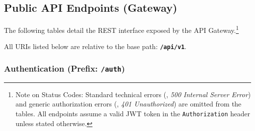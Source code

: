 \subsection{Public API Endpoints (Gateway)}
The following tables detail the REST interface exposed by the API Gateway.\footnote{Note on Status Codes: Standard technical errors (\eg, \emph{500 Internal Server Error}) and generic authorization errors (\eg, \emph{401 Unauthorized}) are omitted from the tables. All endpoints assume a valid JWT token in the \texttt{Authorization} header unless stated otherwise.}

All URIs listed below are relative to the base path: \textbf{\texttt{/api/v1}}.

\subsubsection*{Authentication (Prefix: \texttt{/auth})}
